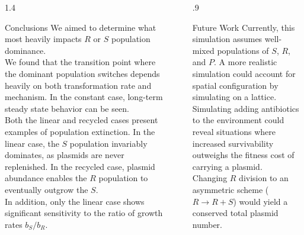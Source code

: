 \documentclass[final]{beamer}
\newlength{\sepwid}
\newlength{\onecolwid}
\begin{document}
\begin{frame}[t]
\begin{block}
\begin{columns}[t]
\begin{column}{1.4\onecolwid}
  \begin{alertblock}{Conclusions}
    We aimed to determine what most heavily impacts $R$ or $S$ population dominance. \\
    \quad\quad We found that the transition point where the dominant population switches
    depends heavily on both transformation rate and mechanism. In the constant case,
    long-term steady state behavior can be seen.\\
    \quad\quad Both the linear and recycled cases present examples of population
    extinction. In the linear case, the $S$ population invariably dominates,
    as plasmids are never replenished. In the recycled case, plasmid
    abundance enables the $R$ population to eventually outgrow the $S$.\\
    \quad\quad In addition, only the linear case shows significant sensitivity
    to the ratio of growth rates $b_S/b_R$.

  \end{alertblock}
\end{column}

\begin{column}{\sepwid}\end{column} %

\begin{column}{.9\onecolwid}
  \begin{alertblock}{Future Work}
    Currently, this simulation assumes well-mixed populations of $S$, $R$, and $P$.
    A more realistic simulation could account for spatial configuration by simulating on a lattice.\\
    \quad\quad Simulating adding antibiotics to the environment could reveal situations
    where increased survivability outweighs the fitness cost of carrying a plasmid. \\
    \quad Changing $R$ division to an asymmetric scheme ($R \rightarrow R + S$) would
    yield a conserved total plasmid number.


\end{alertblock}
\end{column}
\end{columns}
\end{block}
\end{frame}
\end{document}

